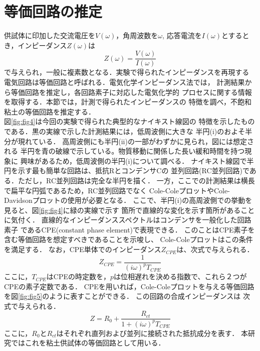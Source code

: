 \documentclass{jsce}
\begin{document}
\section{等価回路の推定\cite{Itagaki}}
供試体に印加した交流電圧を$V(\omega)$，角周波数を$\omega$,
応答電流を$I(\omega)$とするとき，インピーダンス$Z(\omega)$は
\begin{equation}
	Z(\omega)=\frac{V(\omega)}{I(\omega)}
	\label{eqn:def_Z}
\end{equation}
で与えられ，一般に複素数となる．実験で得られたインピーダンスを再現する
電気回路は等価回路と呼ばれる．電気化学インピーダンス法では，
計測結果から等価回路を推定し，各回路素子に対応した電気化学的
プロセスに関する情報を取得する．本節では，計測で得られたインピーダンスの
特徴を調べ，不飽和粘土の等価回路を推定する．\\
\hspace{\parindent}
図\ref{fig:fig4}は今回の実験で得られた典型的なナイキスト線図の
特徴を示したものである．黒の実線で示した計測結果には，低周波側に大きな
半円(i)のおよそ半分が現れている．
高周波側にも半円(ii)の一部がわずかに見られ，図には想定される
半円を青の破線で示している。物質移動に関係した長い緩和時間を持つ現象に
興味があるため，低周波側の半円(i)について調べる．
ナイキスト線図で半円を示す最も簡単な回路は、抵抗RとコンデンサCの
並列回路(RC並列回路)である．ただし，RC並列回路は完全な半円を描く．
一方，ここでの計測結果は横長で扁平な円弧であるため，RC並列回路でなく
Cole-ColeプロットやCole-Davidsonプロットの使用が必要となる．
ここで、半円(i)の高周波側での挙動を見ると、図\ref{fig:fig4}に緑の実線で示す
箇所で直線的な変化を示す箇所があることに気付く．
直線的なインピーダンススペクトルはコンデンサを一般化した回路素子
であるCPE(constant phase element)で表現できる．
このことはCPE素子を含む等価回路を想定すべきであることを示唆し、
Cole-Coleプロットはこの条件を満足する．
なお，CPE単体でのインピーダンス$Z_{CPE}$は、次式で与えられる．
\begin{equation}
	Z_{CPE}=\frac{1}{(i\omega )^pT_{CPE}}
\end{equation}
ここに，$T_{CPE}$はCPEの時定数を，$p$は位相遅れを決める指数で、これら２つがCPEの素子定数である．
CPEを用いれば，Cole-Coleプロットを与える等価回路を図\ref{fig:fig5}のように表すことができる．
この回路の合成インピーダンスは
次式で与えられる．
\begin{equation}
        Z=R_0 +\frac{R_{ct}}{1+\left( i\omega \right)^pT_{CPE}}
        \label{eqn:R_CPE}
\end{equation}
ここに，$R_0$と$R_{ct}$はそれぞれ直列および並列に接続された抵抗成分を表す．
本研究ではこれを粘土供試体の等価回路として用いる．
\end{document}
